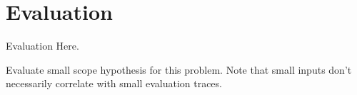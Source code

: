 \chapter{Evaluation}
Evaluation Here.\par 
Evaluate small scope hypothesis for this problem. Note that small inputs don't necessarily correlate with small evaluation traces.
